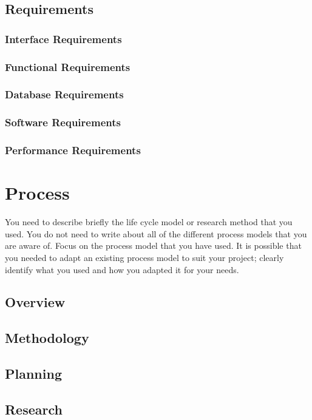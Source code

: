 \subsection{Requirements}
\subsubsection{Interface Requirements}
\subsubsection{Functional Requirements}
\subsubsection{Database Requirements}
\subsubsection{Software Requirements}
\subsubsection{Performance Requirements}

\section{Process}
You need to describe briefly the life cycle model or research method that you used. You do not need to write about all of the different process models that you are aware of. Focus on the process model that you have used. It is possible that you needed to adapt an existing process model to suit your project; clearly identify what you used and how you adapted it for your needs.

\subsection{Overview}
\subsection{Methodology}
\subsection{Planning}
\subsection{Research}

